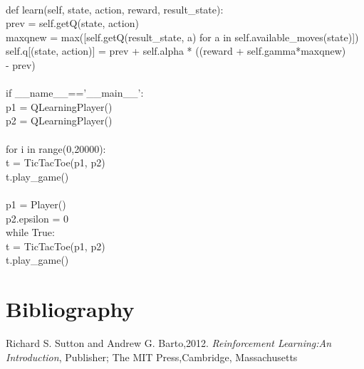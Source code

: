 \documentclass[a4paper, 12pt, notitlepage]{report}
\begin{document}
\\
  \hspace*{4ex}  def learn(self, state, action, reward, result\_state):\\
  \hspace*{8ex}      prev = self.getQ(state, action)\\
  \hspace*{8ex}      maxqnew = max([self.getQ(result\_state, a) for a in self.available\_moves(state)])\\
  \hspace*{8ex}      self.q[(state, action)] = prev + self.alpha * ((reward + self.gamma*maxqnew)\\ \hspace*{50ex} - prev)\\
\\
if \_\_name\_\_=='\_\_main\_\_':\\
  \hspace*{4ex}  p1 = QLearningPlayer()\\
  \hspace*{4ex}  p2 = QLearningPlayer()\\
\\
  \hspace*{4ex}  for i in range(0,20000):\\
  \hspace*{8ex}      t = TicTacToe(p1, p2)\\
  \hspace*{8ex}      t.play\_game()\\
\\
  \hspace*{4ex}  p1 = Player()\\
  \hspace*{4ex}  p2.epsilon = 0\\
  \hspace*{4ex}  while True:\\
  \hspace*{8ex}      t = TicTacToe(p1, p2)\\
  \hspace*{8ex}      t.play\_game()\\




    

\chapter*{Bibliography}
%
\begin{description}

\item Richard S. Sutton and Andrew G. Barto,2012. \emph{Reinforcement Learning:An Introduction}, Publisher; The MIT Press,Cambridge, Massachusetts

\end{description}
\end{document}
